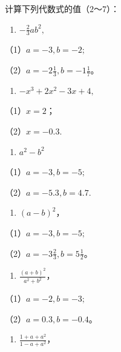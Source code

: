 {\centering
\small\setlength{\tabcolsep}{3pt}%
\par
}

计算下列代数式的值（2～7）：

\begin{enumerate}[start=2]
\item
  \(-\frac{2}{3} ab^2,\)
\end{enumerate}

（1）\(a = -3, b = -2;\)

（2）\(a = -2\frac{1}{3}, b = -1\frac{1}{7}\)。

\begin{enumerate}[start=3]
\item
  \(-x^{3} + 2x^{2} - 3x + 4,\)
\end{enumerate}

（1）\(x = 2\)；

（2）\(x = -0.3.\)

\begin{enumerate}[start=4]
\item
  \(a^2 - b^2\)
\end{enumerate}

（1）\(a = -3, b = -5;\)

（2）\(a = -5.3, b = 4.7.\)

\begin{enumerate}[start=5]
\item
  \((a - b)^{2}\)，
\end{enumerate}

（1）\(a = -3, b = -5;\)

（2）\(a = -3\frac{2}{3}, b = 5\frac{1}{2}\)。

\begin{enumerate}[start=6]
\item
  \(\frac{(a + b)^2}{a^2 + b^2}\)，
\end{enumerate}

（1）\(a = -2, b = -3;\)

（2）\(a = 0.3, b = -0.4\)。

\begin{enumerate}[start=7]
\item
  \(\frac{1 + a + a^2}{1 - a + a^2}\)，
\end{enumerate}

